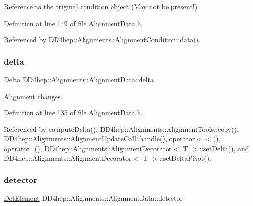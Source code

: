 Reference to the original condition object (May not be present!) 



Definition at line 149 of file Alignment\+Data.\+h.



Referenced by D\+D4hep\+::\+Alignments\+::\+Alignment\+Condition\+::data().

\hypertarget{class_d_d4hep_1_1_alignments_1_1_alignment_data_add24423a741867fc3d3954ee65ec3636}{}\label{class_d_d4hep_1_1_alignments_1_1_alignment_data_add24423a741867fc3d3954ee65ec3636} 
\subsubsection{\texorpdfstring{delta}{delta}}
{\footnotesize\ttfamily \hyperlink{class_d_d4hep_1_1_alignments_1_1_alignment_data_a3e67a5cbb3449006e9552b0f7bd98d45}{Delta} D\+D4hep\+::\+Alignments\+::\+Alignment\+Data\+::delta}



\hyperlink{class_d_d4hep_1_1_alignments_1_1_alignment}{Alignment} changes. 



Definition at line 135 of file Alignment\+Data.\+h.



Referenced by compute\+Delta(), D\+D4hep\+::\+Alignments\+::\+Alignment\+Tools\+::copy(), D\+D4hep\+::\+Alignments\+::\+Alignment\+Update\+Call\+::handle(), operator$<$$<$(), operator=(), D\+D4hep\+::\+Alignments\+::\+Alignment\+Decorator$<$ T $>$\+::set\+Delta(), and D\+D4hep\+::\+Alignments\+::\+Alignment\+Decorator$<$ T $>$\+::set\+Delta\+Pivot().

\hypertarget{class_d_d4hep_1_1_alignments_1_1_alignment_data_abf7096d1f2d3ed307c361f2d6d03710e}{}\label{class_d_d4hep_1_1_alignments_1_1_alignment_data_abf7096d1f2d3ed307c361f2d6d03710e} 
\subsubsection{\texorpdfstring{detector}{detector}}
{\footnotesize\ttfamily \hyperlink{class_d_d4hep_1_1_geometry_1_1_det_element}{Det\+Element} D\+D4hep\+::\+Alignments\+::\+Alignment\+Data\+::detector}



